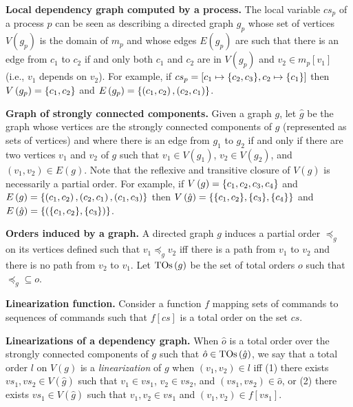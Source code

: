 \textbf{Local dependency graph computed by a process.} The local variable $cs_p$ of a process $p$ can be seen as describing a directed graph $g_p$ whose set of vertices $V\left( g_p \right)$ is the domain of $m_p$ and whose edges $E\left( g_p \right)$ are such that there is an edge from $c_1$ to $c_2$ if and only both $c_1$ and $c_2$ are in $V\left( g_p \right)$ and $v_2 \in m_p\left[ v_1 \right]$ (i.e., $v_1$ depends on $v_2$). For example, if $cs_p = \left[ c_1 \mapsto \aset{c_2,c_3}, c_2 \mapsto \aset{c_1} \right]$ then $V\left(
g_p \right) = \left\{c_1,c_2\right\}$ and $E\left( g_p \right) = \left\{\left( c_1,c_2 \right),\left( c_2,c_1 \right)\right\}$.

\textbf{Graph of strongly connected components.} Given a graph $g$, let $\hat{g}$ be the graph whose vertices are the strongly connected components of $g$ (represented as sets of vertices) and where there is an edge from $g_1$ to $g_2$ if and only if there are two vertices $v_1$ and $v_2$ of $g$ such that $v_1 \in V\left( g_1 \right)$, $v_2 \in V\left( g_2 \right)$, and $\left( v_1,v_2 \right)\in E\left( g \right)$. Note that the reflexive and transitive closure of $V\left(  \hat{g} \right)$ is necessarily a partial order. For example, if $V\left( g
\right)=\left\{c_1,c_2,c_3,c_4\right\}$
and $E\left( g \right)=\left\{\left( c_1,c_2 \right),\left( c_2,c_1 \right),\left( c_1,c_3 \right)\right\}$ then $V\left(\hat{g}\right) = \aset{\aset{c_1,c_2},\aset{c_3},\aset{c_4}}$ and $E\left( \hat{g} \right)=\aset{\left( \aset{c_1,c_2},\aset{c_3} \right)}$.

\textbf{Orders induced by a graph.} A directed graph $g$ induces a partial order $\preceq_g$ on its vertices defined such that $v_1 \preceq_g v_2$ iff there is a path from $v_1$ to $v_2$ and there is no path from $v_2$ to $v_1$.
Let $\operatorname{TOs}\left( g \right)$ be the set of total orders $o$ such that $\preceq_g \subseteq o$.

\textbf{Linearization function.} Consider a function $f$ mapping sets of commands to sequences of commands such that $f\left[ cs \right]$ is a total order on the set $cs$.

\textbf{Linearizations of a dependency graph.}
When $\hat{o}$ is a total order over the strongly connected components of $g$ such that $\hat{o} \in \operatorname{TOs}\left( \hat{g} \right)$, we say that a total order $l$ on $V\left( g \right)$ is a \emph{linearization} of $g$ when $\left(v_1,v_2\right) \in l$ iff (1) there exists $vs_1,vs_2\in V\left(\hat{g}\right)$ such that $v_1\in vs_1$, $v_2\in vs_2$, and $\left( vs_1,vs_2 \right)\in \hat{o}$, or (2) there exists $vs_1\in V\left(\hat{g}\right)$ such that
$v_1,v_2\in  vs_1$ and $\left( v_1,v_2 \right)\in f\left[  vs_1 \right]$.

